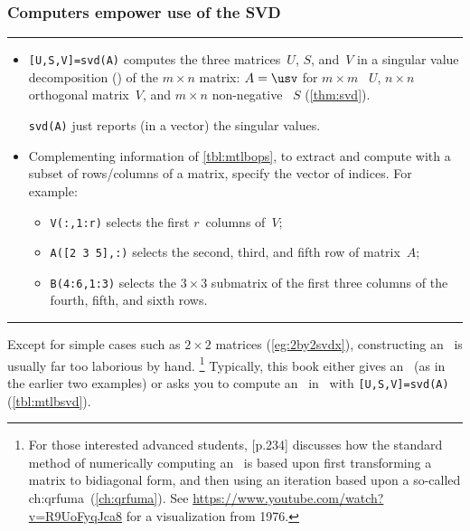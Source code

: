 \subsubsection{Computers empower use of the SVD}

\begin{table}
\caption{As well as the \script\ commands and operations listed in \cref{tbl:mtlbpre,tbl:mtlbbasics,tbl:mtlbops,tbl:mtlbmops},  we need these matrix operations.} \label{tbl:mtlbsvd}
\smallskip\hrule\smallskip
\begin{minipage}{\linewidth}
\begin{itemize}
\item {}\verb|[U,S,V]=svd(A)| computes the three matrices~\(U\), \(S\), and~\(V\) in a singular value decomposition (\svd) of the \(m\times n\) matrix: \(A=\usv\) for \(m\times m\) ~\(U\), \(n\times n\) orthogonal matrix~\(V\), and \(m\times n\) non-negative ~\(S\) (\cref{thm:svd}).

\verb|svd(A)| just reports (in a vector) the singular values.

\item Complementing information of \cref{tbl:mtlbops}, to extract and compute with a subset of rows\slash columns of a matrix, specify the vector of indices.
For example:
\begin{itemize}
\item \verb|V(:,1:r)| selects the first \(r\)~columns of~\(V\);
\item \verb|A([2 3 5],:)| selects the second, third, and fifth row of matrix~\(A\);
\item \verb|B(4:6,1:3)| selects the \(3\times 3\) submatrix of the first three columns of the fourth, fifth, and sixth rows.
\end{itemize}

\end{itemize}
\end{minipage}
\smallskip\hrule
\end{table}




Except for simple cases such as \(2\times 2\) matrices (\cref{eg:2by2svdx}), constructing an \svd\ is usually far too laborious by hand.%
\footnote{For those interested advanced students, \cite{Trefethen1997} [p.234] discusses how the standard method of numerically computing an \svd\ is based upon first transforming a matrix to bidiagonal form, and then using an iteration based upon a so-called \ifcsname ch:qrfuma\endcsname\ (\cref{ch:qrfuma})\fi.
See \url{https://www.youtube.com/watch?v=R9UoFyqJca8} for a visualization from 1976.}
Typically, this book either gives an \svd\ (as in the earlier two examples) or asks you to compute an \svd\ in \script\ with \verb|[U,S,V]=svd(A)| (\cref{tbl:mtlbsvd}).

